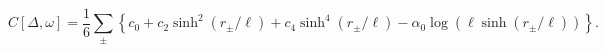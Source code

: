 \begin{equation}
C[\Delta,\omega]=\frac16\sum_{\pm}\left\{
c_0+c_2\sinh^2(r_\pm/\ell)+c_4\sinh^4(r_\pm/\ell)-\alpha_0\log
\left(\ell\sinh(r_\pm/\ell)\right)\right\}.
\end{equation}

